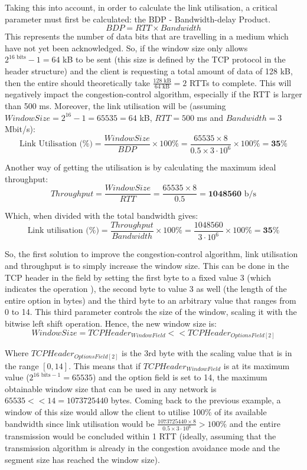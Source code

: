 Taking this into account, in order to calculate the link utilisation, a critical parameter must first be calculated: the BDP - Bandwidth-delay Product.
$$BDP = RTT\times Bandwidth$$
This represents the number of data bits that are  travelling in a medium which have not yet been acknowledged. So, if the window size only allows $2^{16 \text{ bits}} - 1 = 64$ kB to be sent (this size is defined by the TCP protocol in the header structure) and the client is requesting a total amount of data of 128 kB, then the entire  should theoretically take $\tfrac{128 \text{ kB}}{64 \text{ kB}} = 2$ RTTs to complete. This will negatively impact the congestion-control algorithm, especially if the RTT is larger than 500 ms. Moreover, the link utilisation will be (assuming $WindowSize = 2^{16}-1 = 65535 = 64$ kB, $RTT = 500$ ms and $Bandwidth = 3$ Mbit/s):
$$\text{Link Utilisation (\%)} = \dfrac{WindowSize}{BDP}\times 100\% = \dfrac{65535\times 8}{0.5\times 3\cdot10^6}\times 100\% = \mathbf{35}\%$$

Another way of getting the utilisation is by calculating the maximum ideal throughput:
$$Throughput = \dfrac{WindowSize}{RTT} = \dfrac{65535\times 8}{0.5} = \mathbf{1048560} \text{ b/s}$$

Which, when divided with the total bandwidth gives:
$$\text{Link utilisation (\%)} = \dfrac{Throughput}{Bandwidth}\times 100\% = \dfrac{1048560}{3\cdot 10^6}\times 100\% = \mathbf{35}\%$$

So, the first solution to improve the congestion-control algorithm, link utilisation and throughput is to simply increase the window size. This can be done in the TCP header in the  field by setting the first byte to a fixed value 3 (which indicates the operation ), the second byte to value 3 as well (the length of the entire option in bytes) and the third byte to an arbitrary value that ranges from 0 to 14. This third parameter controls the size of the window, scaling it with the bitwise left shift operation. Hence, the new window size is: $$WindowSize = TCPHeader_{WindowField} << TCPHeader_{OptionsField[2]}$$

Where $TCPHeader_{OptionsField[2]}$ is the 3rd byte with the scaling value that is in the range $[0, 14]$. This means that if $TCPHeader_{WindowField}$ is at its maximum value ($2^{16\text{ bits} - 1} = 65535$) and the option field is set to 14, the maximum obtainable window size that can be used in any network is $65535 << 14 = 1073725440$ bytes. Coming back to the previous example, a window of this size would allow the client to utilise 100\% of its available bandwidth since link utilisation would be $\frac{1073725440\times 8}{0.5\times 3\cdot10^6} > 100\%$ and the entire transmission would be concluded within 1 RTT (ideally, assuming that the transmission algorithm is already in the congestion avoidance mode and the segment size has reached the window size).\\

